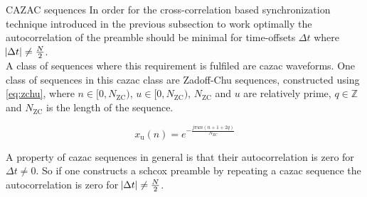 \begin{subchapter}{CAZAC sequences}
  In order for the cross-correlation based synchronization technique
  introduced in the previous subsection to work optimally the
  autocorrelation of the preamble should be minimal for time-offsets $\Delta t$
  where $\abs{\Delta t} \neq \frac{N}{2}$. \\

  A class of sequences where this requirement is fulfiled are
  \gls{cazac} waveforms.
  One class of sequences in this \gls{cazac} class are
  Zadoff-Chu sequences\cite{zadoffchu},
  constructed using \autoref{eq:zchu}, where
  $n \in [0, N_\text{ZC})$, $u \in [0, N_\text{ZC})$,
  $N_\text{ZC}$ and $u$ are relatively prime, $q \in \mathbb{Z}$
  and $N_\text{ZC}$ is the length of the sequence\cite{zcwiki}.

  \begin{equation}
    \label{eq:zchu}
    x_\text{u}(n)= e^{- \frac{j \pi u n \left( n + 1 + 2q \right) }{N_\text{ZC}}}
  \end{equation}

  A property of \gls{cazac} sequences in general is that
  their autocorrelation is zero for $\Delta t \neq 0$.
  So if one constructs a \gls{schcox} preamble by repeating
  a \gls{cazac} sequence the autocorrelation is
  zero for $\abs{\Delta t} \neq \frac{N}{2}$.
\end{subchapter}
